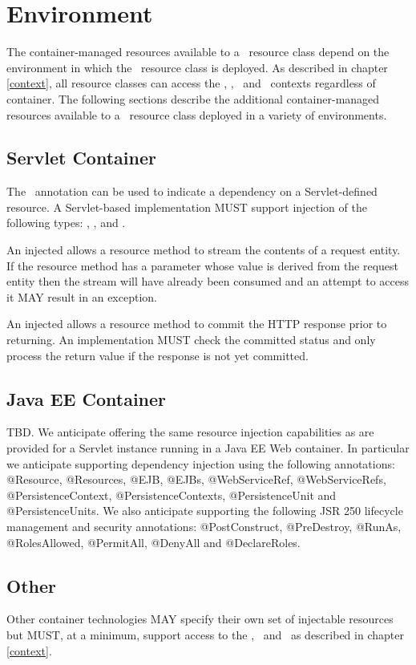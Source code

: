 \chapter{Environment}
\label{environment}

The container-managed resources available to a \jaxrs\ resource class depend on the environment in which the \jaxrs\ resource class is deployed. As described in chapter \ref{context}, all resource classes can access the \SecurityContext, \UriInfo, \HttpHeaders\ and \Request\ contexts regardless of container. The following sections describe the additional container-managed resources available to a \jaxrs\ resource class deployed in a variety of environments.

\section{Servlet Container}

The \Resource\ annotation can be used to indicate a dependency on a Servlet-defined resource. A Servlet-based implementation MUST support injection of the following types: , ,  and .

An injected  allows a resource method to stream the contents of a request entity. If the resource method has a parameter whose value is derived from the request entity then the stream will have already been consumed and an attempt to access it MAY result in an exception.

An injected  allows a resource method to commit the HTTP response prior to returning. An implementation MUST check the committed status and only process the return value if the response is not yet committed.

\section{Java EE Container}

\begin{ednote*}
TBD. We anticipate offering the same resource injection capabilities as are provided for a Servlet instance running in a Java EE Web container. In particular we anticipate supporting dependency injection using the following annotations: @Resource, @Resources, @EJB, @EJBs, @WebServiceRef, @WebServiceRefs, @PersistenceContext, @PersistenceContexts, @PersistenceUnit and @PersistenceUnits. We also anticipate supporting the following JSR 250 lifecycle management and security annotations:  @PostConstruct, @PreDestroy, @RunAs, @RolesAllowed, @PermitAll, @DenyAll and @DeclareRoles.
\end{ednote*}

\section{Other}

Other container technologies MAY specify their own set of injectable resources but MUST, at a minimum, support access to the \UriInfo, \HttpHeaders\ and \Request\ as described in chapter \ref{context}.